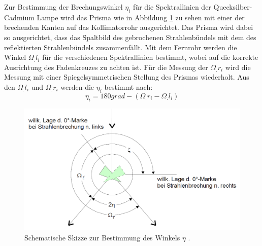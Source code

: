 Zur Bestimmung der Brechungswinkel $\eta_i$ für die Spektrallinien der Quecksilber-Cadmium Lampe wird das Prisma wie in Abbildung \ref{fig:etaMessung} zu sehen mit einer der brechenden Kanten auf das Kollimatorrohr ausgerichtet. Das Prisma wird dabei so ausgerichtet, dass das Spaltbild des gebrochenen Strahlenbündels mit dem des reflektierten Strahlenbündels zusammenfällt. Mit dem Fernrohr werden die Winkel $\Omega_.{l_i}$ für die verschiedenen Spektrallinien bestimmt, wobei auf die korrekte Ausrichtung des Fadenkreuzes zu achten ist. Für die Messung der $\Omega_.{r_i}$ wird die Messung mit einer Spiegelsymmetrischen Stellung des Prismas wiederholt. Aus den $\Omega_.{l_i}$ und $\Omega_.{r_i}$ werden die $\eta_i$ bestimmt nach:
\begin{equation}
\eta_i = 180\si{grad}-(\Omega_.{r_i}-\Omega_.{l_i}) \label{eq:eta}
\end{equation} 

\begin{figure}
\centering
\includegraphics[width=\linewidth-50pt,height=\textheight-50pt,keepaspectratio]{content/images/etaMessung.png}
\caption{Schematische Skizze zur Bestimmung des Winkels $\eta$ \cite{V402}.}
\label{fig:etaMessung}
\end{figure}

%
 